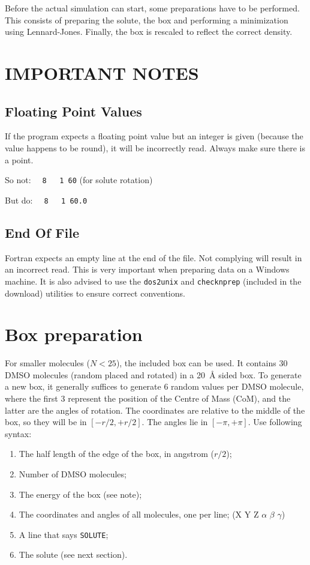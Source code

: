 Before the actual simulation can start, some preparations have to be performed.
This consists of preparing the solute, the box and performing a minimization 
using Lennard-Jones. Finally, the box is rescaled to reflect the correct 
density.

\section{IMPORTANT NOTES}
\subsection{Floating Point Values}
If the program expects a floating point value but an integer is given (because 
the value happens to be round), it will be incorrectly read. Always make sure 
there is a point.

So not: \verb|  8   1 60| (for solute rotation)

But do: \verb|  8   1 60.0|

\subsection{End Of File}
Fortran expects an empty line at the end of the file. Not complying will result 
in an incorrect read. This is very important when preparing data on a Windows 
machine. It is also advised to use the \verb|dos2unix| and \verb|checknprep| 
(included in the download) utilities to ensure correct conventions.

\section{Box preparation}
For smaller molecules ($N < 25$), the included box can be used. It contains 30 
DMSO molecules (random placed and rotated) in a \SI{20}{\angstrom} sided box.
To generate a new box, it generally suffices to generate 6 random values per 
DMSO molecule, where the first 3 represent the position of the Centre of Mass 
(CoM), and the latter are the angles of rotation. The coordinates are relative 
to the middle of the box, so they will be in $[-r/2, +r/2]$. The angles lie in 
$[-\pi, +\pi]$. Use following syntax:

\begin{enumerate}
	\item The half length of the edge of the box, in angstrom ($r/2$);
	\item Number of DMSO molecules;
	\item The energy of the box (see note);
	\item The coordinates and angles of all molecules, one per line; (X Y Z 
	$\alpha$ $\beta$ $\gamma$)
	\item A line that says \verb|SOLUTE|;
	\item The solute (see next section).
\end{enumerate}

